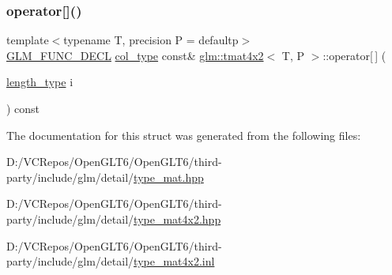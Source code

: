 \mbox{\label{structglm_1_1tmat4x2_a9086b14e8e09c3674a2326d615595625}} 
\subsubsection{\texorpdfstring{operator[]()}{operator[]()}\hspace{0.1cm}{\footnotesize\ttfamily [2/2]}}
{\footnotesize\ttfamily template$<$typename T, precision P = defaultp$>$ \\
\mbox{\hyperlink{setup_8hpp_ab2d052de21a70539923e9bcbf6e83a51}{G\+L\+M\+\_\+\+F\+U\+N\+C\+\_\+\+D\+E\+CL}} \mbox{\hyperlink{structglm_1_1tmat4x2_ac775231a890f4ea29cd0073670309b3a}{col\+\_\+type}} const\& \mbox{\hyperlink{structglm_1_1tmat4x2}{glm\+::tmat4x2}}$<$ T, P $>$\+::operator\mbox{[}$\,$\mbox{]} (\begin{DoxyParamCaption}\item[{\mbox{\hyperlink{structglm_1_1tmat4x2_a28aaf36ee36edef6715c1fae6874f530}{length\+\_\+type}}}]{i }\end{DoxyParamCaption}) const}



The documentation for this struct was generated from the following files\+:\begin{DoxyCompactItemize}
\item 
D\+:/\+V\+C\+Repos/\+Open\+G\+L\+T6/\+Open\+G\+L\+T6/third-\/party/include/glm/detail/\mbox{\hyperlink{type__mat_8hpp}{type\+\_\+mat.\+hpp}}\item 
D\+:/\+V\+C\+Repos/\+Open\+G\+L\+T6/\+Open\+G\+L\+T6/third-\/party/include/glm/detail/\mbox{\hyperlink{type__mat4x2_8hpp}{type\+\_\+mat4x2.\+hpp}}\item 
D\+:/\+V\+C\+Repos/\+Open\+G\+L\+T6/\+Open\+G\+L\+T6/third-\/party/include/glm/detail/\mbox{\hyperlink{type__mat4x2_8inl}{type\+\_\+mat4x2.\+inl}}\end{DoxyCompactItemize}
